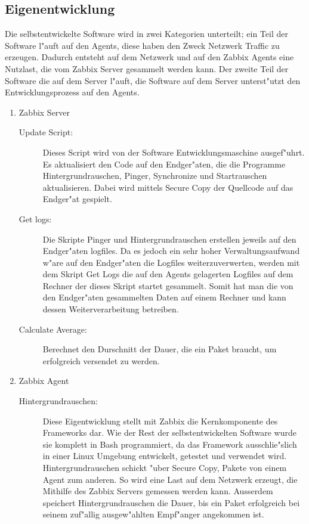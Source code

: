 \subsection{Eigenentwicklung}
Die selbstentwickelte Software wird in zwei Kategorien unterteilt; ein Teil der Software l"auft %
auf den Agents, diese haben den Zweck Netzwerk Traffic zu erzeugen. Dadurch entsteht auf dem Netzwerk und %
auf den Zabbix Agents eine Nutzlast, die vom Zabbix Server gesammelt werden kann. Der zweite Teil der Software %
die auf dem Server l"auft, die Software auf dem Server unterst"utzt den Entwicklungsprozess auf den Agents. %
\begin{enumerate}
\item Zabbix Server 
\begin{description}
\item[Update Script:]Dieses Script wird von der Software Entwicklungsmaschine ausgef"uhrt. Es aktualisiert den Code auf den Endger"aten, %
die die Programme Hintergrundrauschen, Pinger, Synchronize und Startrauschen aktualisieren. Dabei wird mittels Secure Copy %
der Quellcode auf das Endger"at gespielt.

\item[Get logs:]Die Skripte Pinger und Hintergrundrauschen erstellen jeweils auf den Endger"aten logfiles. %
Da es jedoch ein sehr hoher Verwaltungsaufwand w"are auf den Endger"aten die Logfiles weiterzuverwerten, %
werden mit dem Skript Get Logs die auf den Agents gelagerten Logfiles auf dem Rechner der dieses Skript %
startet gesammelt. Somit hat man die von den Endger"aten gesammelten Daten auf einem Rechner und kann %
dessen Weiterverarbeitung betreiben.      

\item[Calculate Average:]Berechnet den Durschnitt der Dauer, die ein Paket braucht, um erfolgreich versendet %
zu werden.
 
\end{description}

\newpage
\item Zabbix Agent

\begin{description}
\item[Hintergrundrauschen:]Diese Eigentwicklung stellt mit Zabbix die Kernkomponente des Frameworks dar. Wie %
der Rest der selbstentwickelten Software wurde sie komplett in Bash programmiert, da das Framework ausschlie"slich %
in einer Linux Umgebung entwickelt, getestet und verwendet wird. Hintergrundrauschen schickt "uber Secure Copy, %
Pakete von einem Agent zum anderen. So wird eine %
Last auf dem Netzwerk erzeugt, die Mithilfe des Zabbix Servers gemessen werden kann. Ausserdem speichert Hintergrundrauschen %
die Dauer, bis ein Paket erfolgreich bei seinem zuf"allig ausgew"ahlten Empf"anger angekommen ist. %


\end{description}
\end{enumerate}
